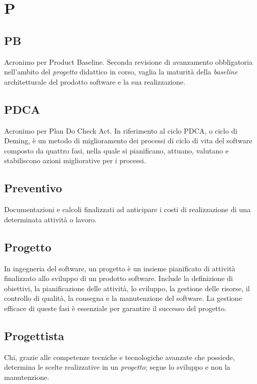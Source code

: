 \chapter{P}

\section{PB}\label{sec:Product Baseline}
Acronimo per Product Baseline. Seconda revisione di avanzamento obbligatoria nell'ambito del \emph{progetto} didattico in corso, vaglia la maturità della \emph{baseline} architetturale del prodotto software e la sua realizzazione.

\section{PDCA}\label{sec:Plan Do Check Act}
Acronimo per Plan Do Check Act. In riferimento al ciclo PDCA, o ciclo di Deming, è un metodo di miglioramento dei processi di ciclo di vita del software composto da quattro fasi, nella quale si pianificano, attuano, valutano e stabiliscono azioni migliorative per i processi.

\section{Preventivo}\label{sec:Preventivi}
Documentazioni e calcoli finalizzati ad anticipare i costi di realizzazione di una determinata attività o lavoro.       

\section{Progetto}\label{sec:Progetti}
In ingegneria del software, un progetto è un insieme pianificato di attività finalizzato allo sviluppo di un prodotto software. Include la definizione di obiettivi, la pianificazione delle attività, lo sviluppo, la gestione delle risorse, il controllo di qualità, la consegna e la manutenzione del software. La gestione efficace di queste fasi è essenziale per garantire il successo del progetto.

\section{Progettista}\label{sec:Progettisti}
Chi, grazie alle competenze tecniche e tecnologiche avanzate che possiede, determina le scelte realizzative in un \emph{progetto}; segue lo sviluppo e non la manutenzione.

